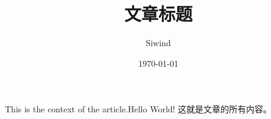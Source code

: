 \documentclass[UTF8]{ctexart}
\title{文章标题}
\author{Siwind}
\date{\today}
\begin{document}
\maketitle
This is the context of the article.Hello World!
这就是文章的所有内容。
\end{document}
